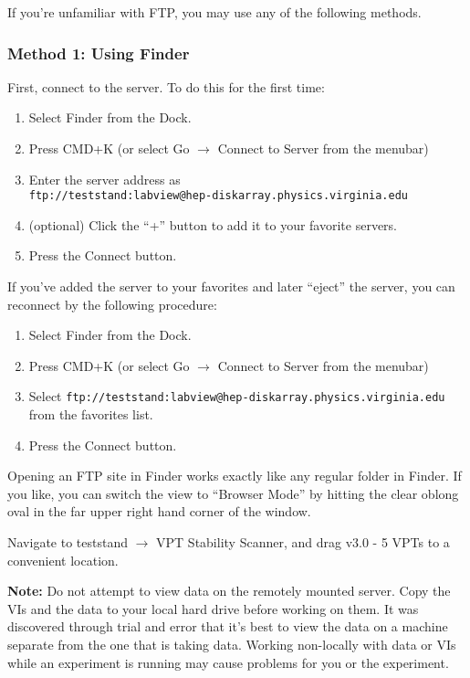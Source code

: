 If you're unfamiliar with FTP, you may use any of the following methods.

\subsubsection{Method 1: Using Finder}
\label{sec:op_start:vptvi:finder}

First, connect to the server.  To do this for the first time:
\begin{enumerate}
\item Select \textsf{Finder} from the Dock.
\item Press CMD+K (or select \textsf{Go $\to$ Connect to Server} from the menubar)
\item Enter the server address as \\
  \texttt{ftp://teststand:labview@hep-diskarray.physics.virginia.edu}
\item (optional) Click the ``+'' button to add it to your favorite servers.
\item Press the \textsf{Connect} button.
\end{enumerate}

If you've added the server to your favorites and later ``eject'' the server, you can reconnect by the following procedure:
\begin{enumerate}
\item Select \textsf{Finder} from the Dock.
\item Press CMD+K (or select \textsf{Go $\to$ Connect to Server} from the menubar)
\item Select \texttt{ftp://teststand:labview@hep-diskarray.physics.virginia.edu} from the favorites list.
\item Press the \textsf{Connect} button.
\end{enumerate}

Opening an FTP site in Finder works exactly like any regular folder in Finder.  If you like, you can switch the view to ``Browser Mode'' by hitting the clear oblong oval in the far upper right hand corner of the window.

Navigate to \textsf{teststand $\to$ VPT Stability Scanner}, and drag \textsf{v3.0 - 5 VPTs} to a convenient location.

\textbf{Note:} Do not attempt to view data on the remotely mounted server.  Copy the VIs and the data to your local hard drive before working on them.  It was discovered through trial and error that it's best to view the data on a machine separate from the one that is taking data.  Working non-locally with data or VIs while an experiment is running may cause problems for you or the experiment.

